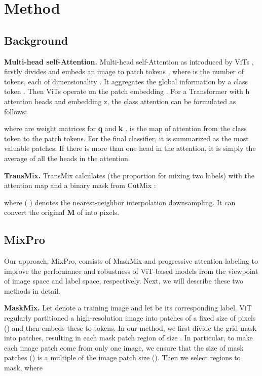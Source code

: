 \documentclass{article} \usepackage{iclr2023_conference,times}
\begin{document}
\section{Method}
\label{subMethod}

\subsection{Background}

\textbf{Multi-head self-Attention.} Multi-head self-Attention as introduced by ViTs \citep{2020ViTs}, firstly divides and embeds an image  to patch tokens , where  is the number of tokens, each of dimensionality . It aggregates the global information by a class token . Then ViTs operate on the patch embedding . For a Transformer with h attention heads and embedding z, the class attention can be formulated as follows:





where  are weight matrices for \textbf{q} and \textbf{k} .  is the map of attention from the class token to the patch tokens. For the final classifier, it is summarized as the most valuable patches. If there is more than one head in the attention, it is simply the average of all the heads in the attention.

\textbf{TransMix.} TransMix \citep{chen2021transmix} calculates  (the proportion for mixing two labels) with the attention map  and a binary mask  from CutMix \citep{yun2019cutmix}:



where  (  ) denotes the nearest-neighbor interpolation downsampling. It can convert the original \textbf{M} of  into  pixels.

\subsection{MixPro}

Our approach, MixPro, consists of MaskMix and progressive attention labeling to improve the performance and robustness of ViT-based models from the viewpoint of image space and label space, respectively. Next, we will describe these two methods in detail.

\textbf{MaskMix.} Let   denote a training image and let  be its corresponding label. ViT \citep{2020ViTs} regularly partitioned a high-resolution image  into  patches of a fixed size of   pixels () and then embeds these to tokens. In our method, we first divide the grid mask   into  patches, resulting in each mask patch region of size . In particular, to make each image patch come from only one image, we ensure that the size of mask patches () is a multiple of the image patch size (). Then we select  regions to mask, where 
\end{document}
